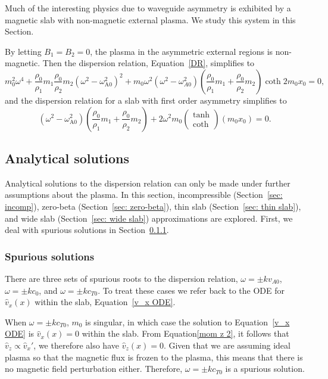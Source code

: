 \documentclass[12pt]{../style-files/ociamthesis}
\begin{document}
Much of the interesting physics due to waveguide asymmetry is exhibited by a magnetic slab with non-magnetic external plasma. We study this system in this Section.

By letting $B_1 = B_2 = 0$, the plasma in the asymmetric external regions is non-magnetic. Then the dispersion relation, Equation~\eqref{DR}, simplifies to
\begin{equation}
m_0^2\omega^4 + \frac{\rho_0}{\rho_1}m_1\frac{\rho_0}{\rho_2}m_2(\omega^2 - \omega_\textrm{A0}^2)^2 + m_0\omega^2(\omega^2 - \omega_{A0}^2)\left(\frac{\rho_0}{\rho_1}m_1 + \frac{\rho_0}{\rho_2}m_2\right)\coth{2m_0x_0} = 0, \label{DR non-mag}
\end{equation}
and the dispersion relation for a slab with first order asymmetry simplifies to
\begin{equation}
(\omega^2 - \omega_\textrm{A0}^2)\left(\frac{\rho_0}{\rho_1}m_1 + \frac{\rho_0}{\rho_2}m_2\right)  +  2\omega^2m_0\left(\begin{matrix}\tanh \\ \coth \end{matrix}\right)(m_0x_0) = 0. \label{DR approx non-mag}
\end{equation}


\subsection{Analytical solutions} \label{sec: analytical solutions}
Analytical solutions to the dispersion relation can only be made under further assumptions about the plasma. In this section, incompressible (Section~\ref{sec: incomp}), zero-beta (Section~\ref{sec: zero-beta}), thin slab (Section~\ref{sec: thin slab}), and wide slab (Section~\ref{sec: wide slab}) approximations are explored. First, we deal with spurious solutions in Section~\ref{sec: spurious}.

\subsubsection{Spurious solutions} \label{sec: spurious}
There are three sets of spurious roots to the dispersion relation, $\omega = \pm kv_{A0}$, $\omega = \pm kc_0$, and $\omega = \pm kc_{T0}$. To treat these cases we refer back to the ODE for $\hat{v}_x(x)$ within the slab, Equation~\eqref{v_x ODE}.

When $\omega = \pm kc_{T0}$, $m_0$ is singular, in which case the solution to Equation~\eqref{v_x ODE} is $\hat{v}_x(x) = 0$ within the slab. From Equation\eqref{mom z 2}, it follows that $\hat{v}_z \propto \hat{v}_x'$, we therefore also have $\hat{v}_z(x) = 0$. Given that we are assuming ideal plasma so that the magnetic flux is frozen to the plasma, this means that there is no magnetic field perturbation either. Therefore, $\omega = \pm kc_{T0}$ is a spurious solution.
\end{document}

